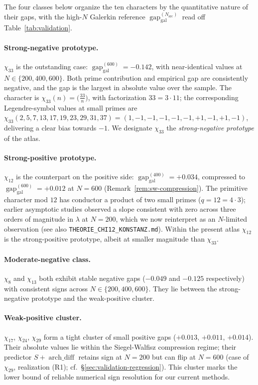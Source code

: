 \documentclass[10pt,twocolumn]{article}
\theoremstyle{definition}
\theoremstyle{remark}
\newcommand{\gap}{\operatorname{gap}}
\newcommand{\chifn}{\chi}
\newcommand{\archdiff}{\operatorname{arch\_diff}}
\begin{document}
The four classes below organize the ten characters by the
quantitative nature of their gaps, with the high-$N$ Galerkin
reference $\gap_{\mathrm{gal}}^{(N_{\mathrm{src}})}$ read off
Table~\ref{tab:validation}.

\paragraph{Strong-negative prototype.}
$\chifn_{33}$ is the outstanding case:
$\gap_{\mathrm{gal}}^{(600)}=-0.142$, with near-identical values at
$N\in\{200,400,600\}$. Both prime contribution and empirical gap
are consistently negative, and the gap is the largest in absolute
value over the sample. The character is
$\chifn_{33}(n)=\bigl(\tfrac{33}{n}\bigr)$, with factorization
$33=3\cdot 11$; the corresponding Legendre-symbol values at small
primes are $\chifn_{33}(2,5,7,13,17,19,23,29,31,37)=
(1,-1,-1,-1,-1,-1,+1,-1,+1,-1)$, delivering a clear bias towards
$-1$. We designate $\chifn_{33}$ the \emph{strong-negative
prototype} of the atlas.

\paragraph{Strong-positive prototype.}
$\chifn_{12}$ is the counterpart on the positive side:
$\gap_{\mathrm{gal}}^{(400)}=+0.034$, compressed to
$\gap_{\mathrm{gal}}^{(600)}=+0.012$ at
$N=600$ (Remark~\ref{rem:sw-compression}). The primitive character
mod $12$ has conductor a product of two small primes ($q=12=
4\cdot 3$); earlier asymptotic studies \cite{AsymptoticScan} observed
a slope consistent with zero across three orders of magnitude in
$\lambda$ at $N=200$, which we now reinterpret as an $N$-limited
observation (see also \texttt{THEORIE\_CHI12\_KONSTANZ.md}). Within
the present atlas $\chifn_{12}$ is the strong-positive prototype,
albeit at smaller magnitude than $\chifn_{33}$.

\paragraph{Moderate-negative class.}
$\chifn_8$ and $\chifn_{13}$ both exhibit stable negative gaps
($-0.049$ and $-0.125$ respectively) with consistent signs across
$N\in\{200,400,600\}$. They lie between the strong-negative
prototype and the weak-positive cluster.

\paragraph{Weak-positive cluster.}
$\chifn_{17}$, $\chifn_{24}$, $\chifn_{29}$ form a tight cluster of
small positive gaps ($+0.013$, $+0.011$, $+0.014$). Their absolute
values lie within the Siegel-Walfisz compression regime; their
predictor $S+\archdiff$ retains sign at $N=200$ but can flip at
$N=600$ (case of $\chifn_{29}$, realization (R1); cf.\
\S\ref{sec:validation-regression}). This cluster marks the lower
bound of reliable numerical sign resolution for our current
methods.
\end{document}
